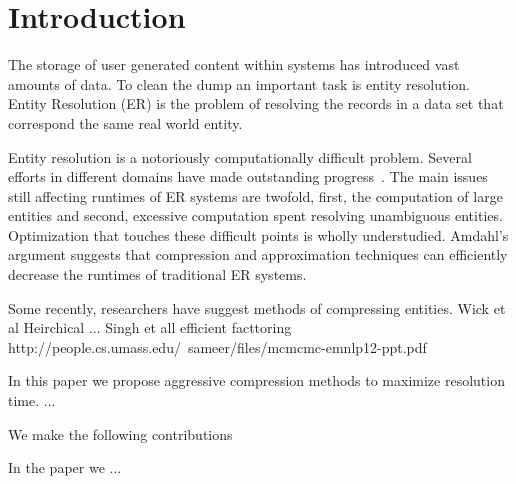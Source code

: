 
\section{Introduction}

The storage of user generated content within systems has introduced 
vast amounts of data.
To clean the dump an important task is entity resolution.
Entity Resolution (ER) is the problem of resolving the records in
a data set that correspond the same real world entity.

Entity resolution is a notoriously computationally difficult problem.
Several efforts in different domains have made outstanding progress~\cite{}.
The main issues still affecting runtimes of ER systems are
twofold, first, the computation of large entities and second, excessive
computation spent resolving unambiguous entities.
Optimization that touches these difficult points is wholly understudied.
Amdahl's argument suggests that compression and approximation 
techniques can efficiently decrease the runtimes of traditional ER systems.

Some recently, researchers have suggest methods of compressing entities.
Wick et al Heirchical ...
Singh et all efficient facttoring http://people.cs.umass.edu/~sameer/files/mcmcmc-emnlp12-ppt.pdf

In this paper we propose aggressive compression methods to maximize resolution time.
...

We make the following contributions

In the paper we ... 





